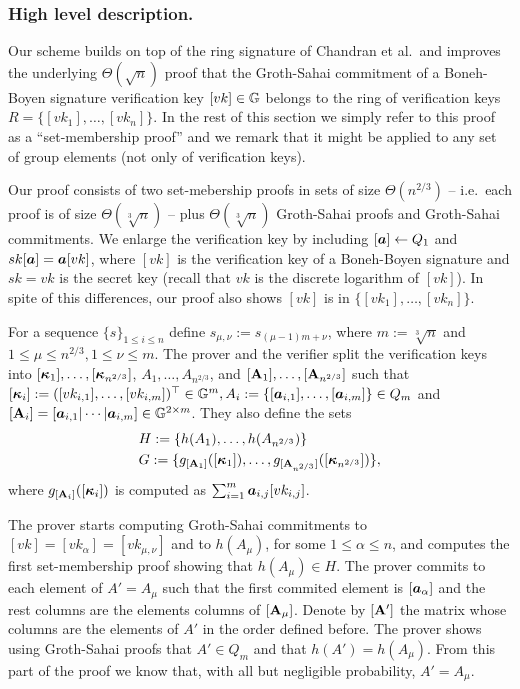 \subsubsection{High level description.}
Our scheme builds on top of the ring signature of Chandran et al.~and improves the underlying $\Theta(\sqrt{n})$ proof that the Groth-Sahai commitment of a Boneh-Boyen signature verification key $[vk]\in\mathbb{G}$ belongs to the ring of verification keys $R=\{[vk_1],\ldots,[vk_n]\}$. In the rest of this section we simply refer to this proof as a ``set-membership proof'' and we remark that it might be applied to any set of group elements (not only of verification keys).

Our proof consists of two set-mebership proofs in sets of size $\Theta(n^{2/3})$ -- i.e.~each proof is of size $\Theta(\sqrt[3]{n})$ --  plus $\Theta(\sqrt[3]{n})$ Groth-Sahai proofs and Groth-Sahai commitments.
We enlarge the verification key by including $[{\boldsymbol{a}}]\gets Q_1$ and $sk[{\boldsymbol{a}}]={\boldsymbol{a}}[vk]$, where $[vk]$ is the verification key of a Boneh-Boyen signature and $sk=vk$ is the secret key (recall that $vk$ is the discrete logarithm of $[vk]$). In spite of this differences, our proof also shows $[vk]$ is in $\{[vk_1],\ldots,[vk_n]\}$.

For a sequence $\{s\}_{1\leq i \leq n}$ define $s_{\mu,\nu}:=s_{(\mu-1)m+\nu}$, where $m:=\sqrt[3]{n}$ and $1\leq\mu\leq n^{2/3},1\leq \nu\leq m$.  The prover and the verifier split the verification keys into $[{\boldsymbol{\kappa}}_1],\ldots, [{\boldsymbol{\kappa}}_{n^{2/3}}]$, $A_1,\ldots, A_{n^{2/3}}$, and $[\mathbf{{A}}_1],\ldots, [\mathbf{{A}}_{n^{2/3}}]$ such that $[{\boldsymbol{\kappa}}_i]:= ([vk_{i,1}],\ldots,[vk_{i,m}])^\top\in\mathbb{G}^m, A_i:=\{[{\boldsymbol{a}}_{i,1}],\ldots,[{\boldsymbol{a}}_{i,m}]\}\in Q_m$ and $[\mathbf{{A}}_i]=[{\boldsymbol{a}}_{i,1}|\cdots|{\boldsymbol{a}}_{i,m}]\in\mathbb{G}^{2\times m}$. They also define the sets
\begin{align*}
&H:=\{h(A_1),\ldots,\allowbreak h(A_{n^{2/3}})\}\\
&G:=\{g_{[\mathbf{{A}}_1]}([{\boldsymbol{\kappa}}_1]),\allowbreak\ldots,g_{[\mathbf{{A}}_{n^{2/3}}]}([{\boldsymbol{\kappa}}_{n^{2/3}}])\},
\end{align*}
where $g_{[\mathbf{{A}}_i]}([{\boldsymbol{\kappa}}_i])$ is computed as $\sum_{i=1}^m {\boldsymbol{a}}_{i,j}[vk_{i,j}]$.

The prover starts computing Groth-Sahai commitments to $[vk]=[vk_\alpha]=[vk_{\mu,\nu}]$ and to $h(A_\mu)$, for some $1\leq \alpha \leq n$, and computes the first set-membership proof showing that $h(A_\mu)\in H$.
The prover commits to each element of $A'=A_\mu$ such that the first commited element is $[{\boldsymbol{a}}_\alpha]$ and the rest columns are the elements columns of $[\mathbf{{A}}_\mu]$. Denote by $[\mathbf{{A}}']$ the matrix whose columns are the elements of $A'$ in the order defined before.  The prover shows using Groth-Sahai proofs that $A'\in Q_m$ and that $h(A')=h(A_\mu)$. From this part of the proof we know that, with all but negligible probability, $A'=A_\mu$.

